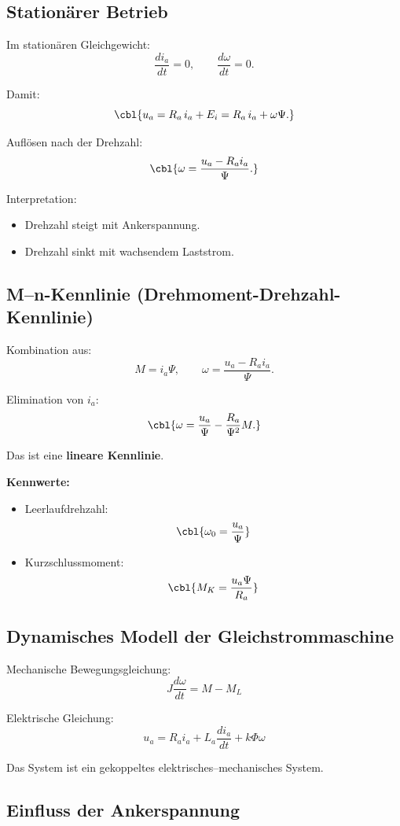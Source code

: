 \subsection{Stationärer Betrieb}

Im stationären Gleichgewicht:
\[
\frac{di_a}{dt} = 0, \qquad \frac{d\omega}{dt} = 0.
\]

Damit:
\[
\cbl{u_a = R_a\, i_a + E_i = R_a\, i_a + \omega \Psi.}
\]

Auflösen nach der Drehzahl:
\[
\cbl{\omega = \frac{u_a - R_a i_a}{\Psi}.}
\]

Interpretation:
\begin{itemize}
    \item Drehzahl steigt mit Ankerspannung.
    \item Drehzahl sinkt mit wachsendem Laststrom.
\end{itemize}

\subsection{M--n-Kennlinie (Drehmoment-Drehzahl-Kennlinie)}

Kombination aus:
\[
M = i_a \Psi, \qquad
\omega = \frac{u_a - R_a i_a}{\Psi}.
\]

Elimination von $i_a$:
\[
\cbl{\omega = \frac{u_a}{\Psi} - \frac{R_a}{\Psi^2} M.}
\]

Das ist eine \textbf{lineare Kennlinie}.



\textbf{Kennwerte:}
\begin{itemize}
    \item Leerlaufdrehzahl:
    \[
    \cbl{\omega_0 = \frac{u_a}{\Psi}}
    \]
    \item Kurzschlussmoment:
    \[
    \cbl{M_K = \frac{u_a \Psi}{R_a}}
    \]
\end{itemize}

\subsection{Dynamisches Modell der Gleichstrommaschine}

Mechanische Bewegungsgleichung:
\[
\boxed{J \frac{d\omega}{dt} = M - M_L}
\]

Elektrische Gleichung:
\[
\boxed{u_a = R_a i_a + L_a \frac{di_a}{dt} + k\Phi \omega}
\]

Das System ist ein gekoppeltes elektrisches–mechanisches System.

\subsection{Einfluss der Ankerspannung}

